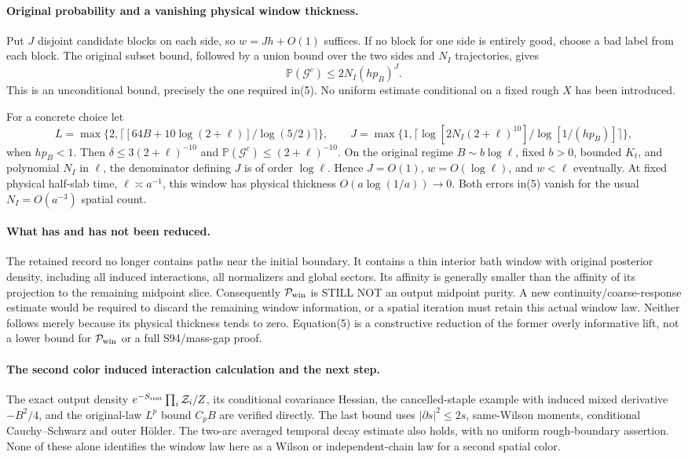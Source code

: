 \documentclass[11pt]{article}
\begin{document}
\paragraph{Original probability and a vanishing physical window thickness.}
Put $J$ disjoint candidate blocks on each side, so $w=Jh+O(1)$ suffices.
If no block for one side is entirely good, choose a bad label from each block.
The original subset bound, followed by a union bound over the two sides and
$N_I$ trajectories, gives
\[
 \mathbb P(\mathcal G^c)\le2N_I(hp_B)^J.                               \tag{6}
\]
This is an unconditional bound, precisely the one required in(5). No uniform
estimate conditional on a fixed rough $X$ has been introduced.

For a concrete choice let
\[
 L=\max\{2,\lceil[64B+10\log(2+\ell)]/\log(5/2)\rceil\},\qquad
 J=\max\{1,\lceil\log[2N_I(2+\ell)^{10}]/\log[1/(hp_B)]\rceil\},       \tag{7}
\]
when $hp_B<1$. Then $\delta\le3(2+\ell)^{-10}$ and
$\mathbb P(\mathcal G^c)\le(2+\ell)^{-10}$.
On the original regime $B\sim b\log\ell$, fixed $b>0$, bounded $K_t$, and
polynomial $N_I$ in $\ell$, the denominator defining $J$ is of order
$\log\ell$. Hence $J=O(1)$, $w=O(\log\ell)$, and $w<\ell$ eventually.
At fixed physical half-slab time, $\ell\asymp a^{-1}$, this window has physical
thickness $O(a\log(1/a))\to0$. Both errors in(5) vanish for the usual
$N_I=O(a^{-3})$ spatial count.

\paragraph{What has and has not been reduced.}
The retained record no longer contains paths near the initial boundary.
It contains a thin interior bath window with original posterior density,
including all induced interactions, all normalizers and global sectors.
Its affinity is generally smaller than the affinity of its projection to the
remaining midpoint slice. Consequently $\mathcal P_{\rm win}$ is STILL NOT
an output midpoint purity. A new continuity/coarse-response estimate would
be required to discard the remaining window information, or a spatial
iteration must retain this actual window law. Neither follows merely because
its physical thickness tends to zero. Equation(5) is a constructive reduction
of the former overly informative lift, not a lower bound for
$\mathcal P_{\rm win}$ or a full S94/mass-gap proof.

\paragraph{The second color induced interaction calculation and the next step.}
The exact output density $e^{-S_{\rm rest}}\prod_i\mathcal Z_i/Z$, its
conditional covariance Hessian, the cancelled-staple example with induced
mixed derivative $-B^2/4$, and the original-law $L^p$ bound $C_pB$ are
verified directly. The last bound uses $|\partial s|^2\le2s$, same-Wilson moments,
conditional Cauchy--Schwarz and outer H\"older. The two-arc averaged temporal
decay estimate also holds, with no uniform rough-boundary assertion. None
of these alone identifies the window law here as a Wilson or independent-chain
law for a second spatial color.
\end{document}
